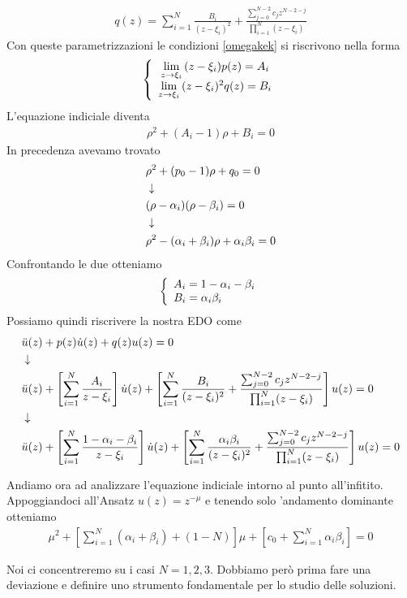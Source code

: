 \begin{align}
	q(z) = \sum_{i=1}^{N} \frac{B_i}{(z-\xi_i)^2} +  \frac{\sum_{j=0}^{N-2} c_j z^{N-2-j} }{\prod_{i=1}^{N}(z-\xi_i)}
\end{align}
Con queste parametrizzazioni le condizioni \ref{omegakek} si riscrivono nella forma
\begin{align}
	\left\{ \begin{array}{cc} \underset{z \rightarrow \xi_i}{\lim} \, (z-\xi_i)p(z) = A_i\\ \underset{z \rightarrow \xi_i}{\lim} \, (z-\xi_i)^2 q(z)= B_i \end{array} \right.
\end{align}
L'equazione indiciale diventa
\begin{align}
	\rho^2 + (A_i -1)\rho + B_i = 0
\end{align}
In precedenza avevamo trovato
\begin{align}
	&\rho^2 + (p_0 -1)\rho + q_0 = 0 \\ &\downarrow \nonumber \\
	&(\rho- \alpha_i)(\rho- \beta_i) = 0 \nonumber \\ &\downarrow \nonumber \\
	&\rho^2 - (\alpha_i + \beta_i) \rho +\alpha_i\beta_i = 0
\end{align}
Confrontando le due otteniamo
\begin{align}
	\double{ A_i =  1 - \alpha_i - \beta_i}{B_i = \alpha_i\beta_i \hfill}
\end{align}
Possiamo quindi riscrivere la nostra EDO come
\begin{align}
	&\ddot{u}(z) + p(z)\dot{u}(z) + q(z)u(z) = 0\\ &\downarrow \nonumber \\
	&\ddot{u}(z) + \left[ \sum_{i=1}^{N} \frac{A_i}{z-\xi_i} \right] \dot{u}(z) + \left[ \sum_{i=1}^{N} \frac{B_i}{(z-\xi_i)^2} +  \frac{\sum_{j=0}^{N-2} c_j z^{N-2-j} }{\prod_{i=1}^{N}(z-\xi_i)} \right] u(z) = 0\nonumber \\ &\downarrow \nonumber \\
	&\ddot{u}(z) + \left[ \sum_{i=1}^{N} \frac{1 - \alpha_i - \beta_i}{z-\xi_i} \right] \dot{u}(z) + \left[ \sum_{i=1}^{N} \frac{\alpha_i\beta_i}{(z-\xi_i)^2} +  \frac{\sum_{j=0}^{N-2} c_j z^{N-2-j} }{\prod_{i=1}^{N}(z-\xi_i)} \right] u(z) = 0
\end{align}

Andiamo ora ad analizzare l'equazione indiciale intorno al punto all'infitito. Appoggiandoci all'Ansatz $u(z) = z^{-\mu}$ e tenendo solo 'andamento dominante otteniamo
\begin{align}
	\mu^2 + \left[ \sum_{i=1}^{N} (\alpha_i + \beta_i) + (1-N) \right]\mu + \left[ c_0 + \sum_{i=1}^{N}\alpha_i \beta_i \right] = 0
\end{align}

Noi ci concentreremo su i casi $N=1,2,3$. Dobbiamo però prima fare una deviazione e definire uno strumento fondamentale per lo studio delle soluzioni.


